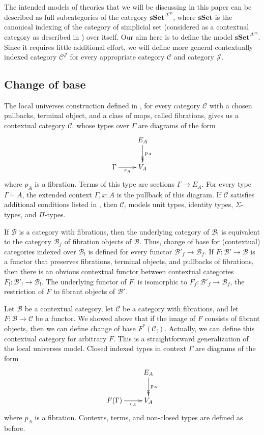 \documentclass[reqno]{amsart}
\theoremstyle{definition}
\theoremstyle{remark}
\newcommand{\fs}[1]{\mathrm{#1}}
\newcommand{\cat}[1]{\mathbf{#1}}
\newcommand{\scat}[1]{\mathcal{#1}}
\newcommand{\sSet}{\cat{sSet}}
\numberwithin{figure}{section}
\begin{document}
The intended models of theories that we will be discussing in this paper can be described as full subcategories of the category $\sSet^{\Delta^\fs{op}}$,
where $\sSet$ is the canonical indexing of the category of simplicial set (considered as a contextual category as described in \cite{kap-lum-voe}) over itself.
Our aim here is to define the model $\sSet^{\Delta^\fs{op}}$.
Since it requires little additional effort, we will define more general contextually indexed category $\scat{C}^\scat{J}$ for every appropriate category $\scat{C}$ and category $\scat{J}$.

\subsection{Change of base}

The local universes construction defined in \cite{local-universes}, for every category $\scat{C}$ with a chosen pullbacks, terminal object, and a class of maps, called fibrations,
gives us a contextual category $\scat{C}_!$ whose types over $\Gamma$ are diagrams of the form
\[ \xymatrix{                       & E_A \ar@{->>}[d]^{p_A} \\
              \Gamma \ar[r]_-{r_A}  & V_A
            } \]
where $p_A$ is a fibration.
Terms of this type are sections $\Gamma \to E_A$.
For every type $\Gamma \vdash A$, the extended context $\Gamma, x : A$ is the pullback of this diagram.
If $\scat{C}$ satisfies additional conditions listed in \cite[Definition~4.2.1]{local-universes}, then $\scat{C}_!$ models unit types, identity types, $\Sigma$-types, and $\Pi$-types.

If $\scat{B}$ is a category with fibrations, then the underlying category of $\scat{B}_!$ is equivalent to the category $\scat{B}_f$ of fibration objects of $\scat{B}$.
Thus, change of base for (contextual) categories indexed over $\scat{B}_!$ is defined for every functor $\scat{B}'_f \to \scat{B}_f$.
If $F : \scat{B}' \to \scat{B}$ is a functor that preserves fibrations, terminal objects, and pullbacks of fibrations, then there is an obvious contextual functor between contextual categories $F_! : \scat{B}'_! \to \scat{B}_!$.
The underlying functor of $F_!$ is isomorphic to $F_f : \scat{B}'_f \to \scat{B}_f$, the restriction of $F$ to fibrant objects of $\scat{B}'$.

Let $\scat{B}$ be a contextual category, let $\scat{C}$ be a category with fibrations, and let $F : \scat{B} \to \scat{C}$ be a functor.
We showed above that if the image of $F$ consists of fibrant objects, then we can define change of base $F^*(\scat{C}_!)$.
Actually, we can define this contextual category for arbitrary $F$.
This is a straightforward generalization of the local universes model.
Closed indexed types in context $\Gamma$ are diagrams of the form
\[ \xymatrix{                           & E_A \ar@{->>}[d]^{p_A} \\
              F(\Gamma) \ar[r]_-{r_A}   & V_A
            } \]
where $p_A$ is a fibration.
Contexts, terms, and non-closed types are defined as before.
\end{document}
